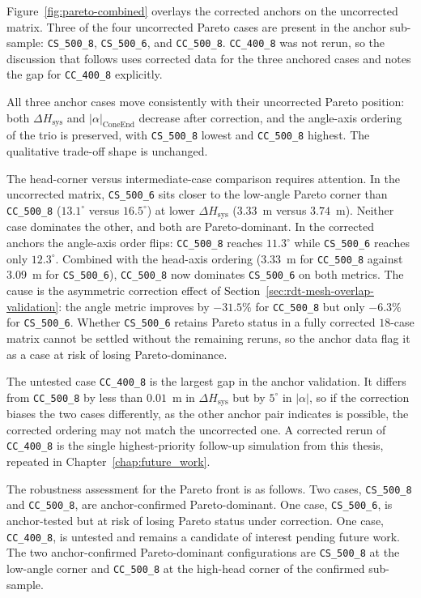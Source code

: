 Figure~\ref{fig:pareto-combined} overlays the corrected anchors on the uncorrected matrix. Three of the four uncorrected Pareto cases are present in the anchor sub-sample: \texttt{CS\_500\_8}, \texttt{CS\_500\_6}, and \texttt{CC\_500\_8}. \texttt{CC\_400\_8} was not rerun, so the discussion that follows uses corrected data for the three anchored cases and notes the gap for \texttt{CC\_400\_8} explicitly.

All three anchor cases move consistently with their uncorrected Pareto position: both $\Delta H_{\mathrm{sys}}$ and $|\alpha|_{\mathrm{ConeEnd}}$ decrease after correction, and the angle-axis ordering of the trio is preserved, with \texttt{CS\_500\_8} lowest and \texttt{CC\_500\_8} highest. The qualitative trade-off shape is unchanged.

The head-corner versus intermediate-case comparison requires attention. In the uncorrected matrix, \texttt{CS\_500\_6} sits closer to the low-angle Pareto corner than \texttt{CC\_500\_8} ($13.1^\circ$ versus $16.5^\circ$) at lower $\Delta H_{\mathrm{sys}}$ ($3.33$~m versus $3.74$~m). Neither case dominates the other, and both are Pareto-dominant. In the corrected anchors the angle-axis order flips: \texttt{CC\_500\_8} reaches $11.3^\circ$ while \texttt{CS\_500\_6} reaches only $12.3^\circ$. Combined with the head-axis ordering ($3.33$~m for \texttt{CC\_500\_8} against $3.09$~m for \texttt{CS\_500\_6}), \texttt{CC\_500\_8} now dominates \texttt{CS\_500\_6} on both metrics. The cause is the asymmetric correction effect of Section~\ref{sec:rdt-mesh-overlap-validation}: the angle metric improves by $-31.5\%$ for \texttt{CC\_500\_8} but only $-6.3\%$ for \texttt{CS\_500\_6}. Whether \texttt{CS\_500\_6} retains Pareto status in a fully corrected $18$-case matrix cannot be settled without the remaining reruns, so the anchor data flag it as a case at risk of losing Pareto-dominance.

The untested case \texttt{CC\_400\_8} is the largest gap in the anchor validation. It differs from \texttt{CC\_500\_8} by less than $0.01$~m in $\Delta H_{\mathrm{sys}}$ but by $5^\circ$ in $|\alpha|$, so if the correction biases the two cases differently, as the other anchor pair indicates is possible, the corrected ordering may not match the uncorrected one. A corrected rerun of \texttt{CC\_400\_8} is the single highest-priority follow-up simulation from this thesis, repeated in Chapter~\ref{chap:future_work}.

The robustness assessment for the Pareto front is as follows. Two cases, \texttt{CS\_500\_8} and \texttt{CC\_500\_8}, are anchor-confirmed Pareto-dominant. One case, \texttt{CS\_500\_6}, is anchor-tested but at risk of losing Pareto status under correction. One case, \texttt{CC\_400\_8}, is untested and remains a candidate of interest pending future work. The two anchor-confirmed Pareto-dominant configurations are \texttt{CS\_500\_8} at the low-angle corner and \texttt{CC\_500\_8} at the high-head corner of the confirmed sub-sample.


